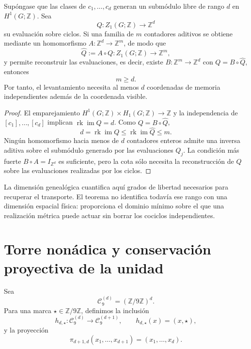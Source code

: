 \begin{theorem}
\label{thm:rango-dimensional-cohomologico-rev2}
Supóngase que las clases de \(c_1,\ldots,c_d\) generan un submódulo libre de
rango \(d\) en \(H^1(G;\mathbb Z)\). Sea
\[
 Q:Z_1(G;\mathbb Z)\longrightarrow\mathbb Z^d
\]
su evaluación sobre ciclos. Si una familia de \(m\) contadores aditivos se
obtiene mediante un homomorfismo \(A:\mathbb Z^d\to\mathbb Z^m\), de modo
que
\[
 \widehat Q:=A\circ Q:Z_1(G;\mathbb Z)\longrightarrow\mathbb Z^m,
\]
y permite reconstruir las evaluaciones, es decir, existe
\(B:\mathbb Z^m\to\mathbb Z^d\) con
\(Q=B\circ\widehat Q\), entonces
\[
 \boxed{m\geq d}.
\]
Por tanto, el levantamiento necesita al menos \(d\) coordenadas de memoria
independientes además de la coordenada visible.
\end{theorem}

\begin{proof}
El emparejamiento
\(H^1(G;\mathbb Z)\times H_1(G;\mathbb Z)\to\mathbb Z\) y la independencia
de \([c_1],\ldots,[c_d]\) implican
\(\operatorname{rk}\operatorname{im}Q=d\). Como
\(Q=B\circ\widehat Q\),
\[
 d=\operatorname{rk}\operatorname{im}Q
 \leq\operatorname{rk}\operatorname{im}\widehat Q\leq m.
\]
Ningún homomorfismo hacia menos de \(d\) contadores enteros admite una
inversa aditiva sobre el submódulo generado por las evaluaciones \(Q_j\).
La condición más fuerte \(B\circ A=I_{\mathbb Z^d}\) es suficiente, pero la
cota sólo necesita la reconstrucción de \(Q\) sobre las evaluaciones
realizadas por los ciclos.
\end{proof}

La dimensión genealógica cuantifica aquí grados de libertad necesarios para
recuperar el transporte. El teorema no identifica todavía ese rango con una
dimensión espacial física: proporciona el dominio mínimo sobre el que una
realización métrica puede actuar sin borrar los cociclos independientes.

\section{Torre nonádica y conservación proyectiva de la unidad}

Sea
\[
 \mathcal C_9^{(d)}=(\mathbb Z/9\mathbb Z)^d.
\]
Para una marca \(\star\in\mathbb Z/9\mathbb Z\), definimos la inclusión
\[
 h_{d,\star}:\mathcal C_9^{(d)}\longrightarrow
 \mathcal C_9^{(d+1)},
 \qquad h_{d,\star}(x)=(x,\star),
\]
y la proyección
\[
 \pi_{d+1,d}(x_1,\ldots,x_{d+1})=(x_1,\ldots,x_d).
\]

